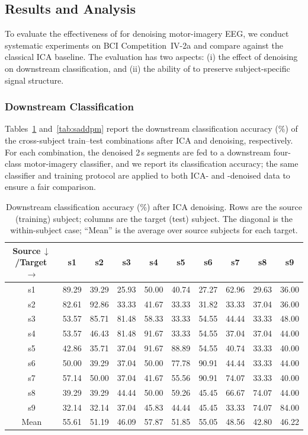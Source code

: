 \subsection{Results and Analysis}
\label{sec:exp_results}

To evaluate the effectiveness of \saddpm{} for denoising motor-imagery EEG, we
conduct systematic experiments on BCI Competition~IV-2a and compare against the
classical ICA baseline. The evaluation has two aspects: (i) the effect of
denoising on downstream classification, and (ii) the ability of \saddpm{} to
preserve subject-specific signal structure.

\subsubsection{Downstream Classification}
Tables~\ref{tab:ica} and~\ref{tab:saddpm} report the downstream classification
accuracy (\%) of the cross-subject train--test combinations after ICA and
\saddpm{} denoising, respectively. For each combination, the denoised 2\,s
segments are fed to a downstream four-class motor-imagery classifier, and we
report its classification accuracy; the same classifier and training protocol
are applied to both ICA- and \saddpm{}-denoised data to ensure a fair
comparison.

\begin{table}[t]
  \caption{Downstream classification accuracy (\%) after ICA denoising. Rows are
  the source (training) subject; columns are the target (test) subject. The
  diagonal is the within-subject case; ``Mean'' is the average over source
  subjects for each target.}
  \label{tab:ica}
  \footnotesize
  \setlength{\tabcolsep}{4.2pt}
  \begin{tabular}{c*{9}{c}}
    \toprule
    Source\,$\downarrow$\;/\;Target\,$\rightarrow$ & s1 & s2 & s3 & s4 & s5 & s6 & s7 & s8 & s9 \\
    \midrule
    s1 & 89.29 & 39.29 & 25.93 & 50.00 & 40.74 & 27.27 & 62.96 & 29.63 & 36.00 \\
    s2 & 82.61 & 92.86 & 33.33 & 41.67 & 33.33 & 31.82 & 33.33 & 37.04 & 36.00 \\
    s3 & 53.57 & 85.71 & 81.48 & 58.33 & 33.33 & 54.55 & 44.44 & 33.33 & 48.00 \\
    s4 & 53.57 & 46.43 & 81.48 & 91.67 & 33.33 & 54.55 & 37.04 & 37.04 & 44.00 \\
    s5 & 42.86 & 35.71 & 37.04 & 91.67 & 88.89 & 54.55 & 40.74 & 33.33 & 40.00 \\
    s6 & 50.00 & 39.29 & 37.04 & 50.00 & 77.78 & 90.91 & 44.44 & 33.33 & 44.00 \\
    s7 & 57.14 & 50.00 & 37.04 & 41.67 & 55.56 & 90.91 & 74.07 & 33.33 & 40.00 \\
    s8 & 39.29 & 39.29 & 44.44 & 50.00 & 59.26 & 45.45 & 66.67 & 74.07 & 44.00 \\
    s9 & 32.14 & 32.14 & 37.04 & 45.83 & 44.44 & 45.45 & 33.33 & 74.07 & 84.00 \\
    \midrule
    Mean & 55.61 & 51.19 & 46.09 & 57.87 & 51.85 & 55.05 & 48.56 & 42.80 & 46.22 \\
    \bottomrule
  \end{tabular}
\end{table}

